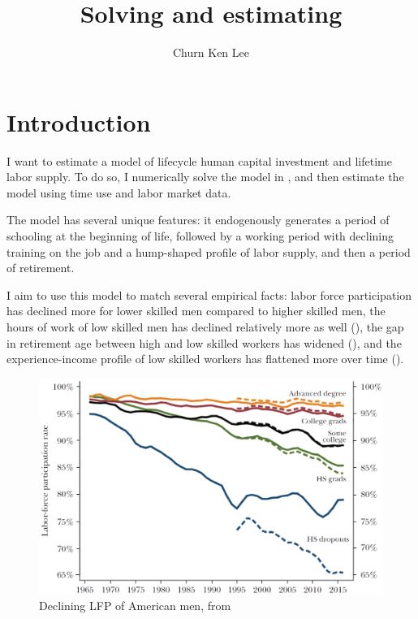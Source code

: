 \documentclass[12pt]{article}
\title{Solving and estimating \textcite{blinder_weiss_1976_lifecycle_human_capital_labor_supply_synthesis}}
\author{Churn Ken Lee}
\date{}
\begin{document}
\maketitle

\section{Introduction}
I want to estimate a model of lifecycle human capital investment and lifetime labor supply. To do so, I numerically solve the model in \textcite{blinder_weiss_1976_lifecycle_human_capital_labor_supply_synthesis}, and then estimate the model using time use and labor market data.

The model has several unique features: it endogenously generates a period of schooling at the beginning of life, followed by a working period with declining training on the job and a hump-shaped profile of labor supply, and then a period of retirement.

I aim to use this model to match several empirical facts: labor force participation has declined more for lower skilled men compared to higher skilled men, the hours of work of low skilled men has declined relatively more as well (\textcite{aguair_bils_charles_hurst_2017_WP_video_games_labor_supply}), the gap in retirement age between high and low skilled workers has widened (\textcite{rutledge_2018_retirement_age_gap_education}), and the experience-income profile of low skilled workers has flattened more over time (\textcite{elsby_shapiro_2012_AER_trend_growth_employment}).

\begin{figure}[]
    \includegraphics[width = \textwidth]{../../output/participation_education.png}
    \centering
    \caption{Declining LFP of American men, from \textcite{binder_bound_2019_JEP_declining_LFP_less_educated}}
\end{figure}
\end{document}

